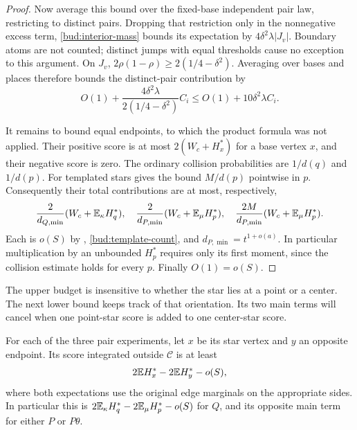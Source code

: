 \begin{proof}
Now average this bound over the fixed-base independent pair law,
restricting to distinct pairs.  Dropping that restriction only in
the nonnegative excess term, \eqref{bud:interior-mass} bounds its
expectation by $4\delta^2\lambda|J_v|$.  Boundary atoms are not
counted; distinct jumps with equal thresholds cause no exception
to this argument.  On $J_v$,
$2\rho(1-\rho)\ge2(1/4-\delta^2)$.  Averaging over bases and places
therefore bounds the distinct-pair contribution by
\[
 O(1)+\frac{4\delta^2\lambda}{2(1/4-\delta^2)}C_i
 \le O(1)+10\delta^2\lambda C_i.
\]

It remains to bound equal endpoints, to which the product formula
was not applied.  Their positive score is at most
$2(W_c+H_x^*)$ for a base vertex $x$, and their negative score is
zero.  The ordinary collision probabilities are $1/d(q)$ and
$1/d(p)$.  For templated stars  gives the bound
$M/d(p)$ pointwise in $p$.  Consequently their total contributions
are at most, respectively,
\[
 \frac{2}{d_{Q,\min}}(W_c+\mathbb E_\kappa H_q^*),\quad
 \frac{2}{d_{P,\min}}(W_c+\mathbb E_\mu H_p^*),\quad
 \frac{2M}{d_{P,\min}}(W_c+\mathbb E_\mu H_p^*).
\]
Each is $o(S)$ by ,
\eqref{bud:template-count}, and
$d_{P,\min}=t^{1+o(a)}$.  In particular multiplication by an
unbounded $H_p^*$ requires only its first moment, since the
collision estimate holds for every $p$.  Finally $O(1)=o(S)$.
\end{proof}

The upper budget is insensitive to whether the star lies at a
point or a center.  The next lower bound keeps track of that
orientation.  Its two main terms will cancel when one point-star
score is added to one center-star score.

\begin{proposition}\label{bud:rare-lower}
For each of the three pair experiments, let $x$ be its star vertex
and $y$ an opposite endpoint.  Its score integrated outside
$\mathcal C$ is at least
\begin{equation}\label{bud:rare-lower-equation}
 2\mathbb E H_x^*-2\mathbb E H_y^*-o(S),
\end{equation}
where both expectations use the original edge marginals on the
appropriate sides.  In particular this is
$2\mathbb E_\kappa H_q^*-2\mathbb E_\mu H_p^*-o(S)$ for $Q$, and its opposite
main term for either $P$ or $P\theta$.
\end{proposition}


